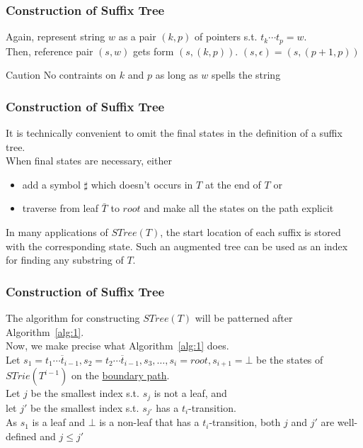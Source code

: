 \documentclass[compress,usenames,dvipsnames]{beamer}
\begin{document}
    \begin{frame}\frametitle{Construction of Suffix Tree}
        Again, represent string $w$ as a pair $(k, p)$ of pointers s.t. $t_k \cdots t_p = w$. \\
        Then, reference pair $(s, w)$ gets form $(s, (k, p))$. $(s, \epsilon) = (s, (p + 1, p))$ \\
        \begin{alertblock}{Caution}
            No contraints on $k$ and $p$ as long as $w$ spells the string
        \end{alertblock}
    \end{frame}

    \begin{frame}\frametitle{Construction of Suffix Tree}
        It is technically convenient to omit the final states in the definition of a suffix tree. \\
        When final states are necessary, either \\
        \begin{itemize}
            \item add a symbol $\sharp$ which doesn't occurs in $T$ at the end of $T$ or 
            \item traverse from leaf $\bar{T}$ to $root$ and make all the states on the path explicit
        \end{itemize}
        In many applications of $STree(T)$, the start location of each suffix is stored with the corresponding state. Such an augmented tree can be used as an index for finding any substring of $T$.
    \end{frame}

    \begin{frame}\frametitle{Construction of Suffix Tree}
        The algorithm for constructing $STree(T)$ will be patterned after Algorithm~\ref{alg:1}. \\
        Now, we make precise what Algorithm~\ref{alg:1} does. \\
        \hfill \break
        Let $s_1 = \overline{t_1\cdots t_{i-1}},s_2=\overline{t_2\cdots t_{i-1}},s_3,\ldots,s_i=root,s_{i+1}=\bot$ be the states of $STrie(T^{i-1})$ on the \underline{boundary path}. \\
        \hfill \break
        Let $j$ be the smallest index s.t. $s_j$ is not a leaf, and \\
        let $j'$ be the smallest index s.t. $s_{j'}$ has a $t_i$-transition. \\
        \hfill \break
        As $s_1$ is a leaf and $\bot$ is a non-leaf that has a $t_i$-transition, both $j$ and $j'$ are well-defined and $j \leq j'$
    \end{frame}
\end{document}
